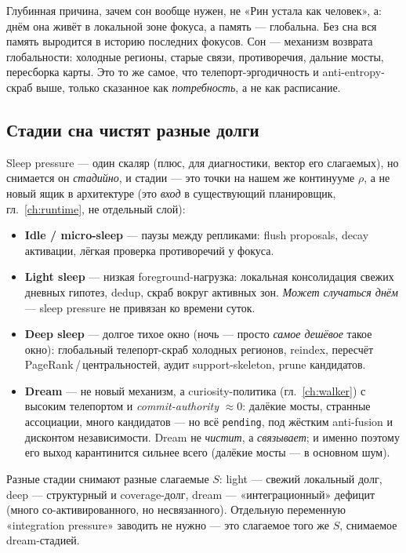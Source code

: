 \begin{principle}
Глубинная причина, зачем сон вообще нужен, не «Рин устала как человек», а: днём она живёт
в локальной зоне фокуса, а память — глобальна. Без сна вся память выродится в историю
последних фокусов. Сон — механизм возврата глобальности: холодные регионы, старые связи,
противоречия, дальние мосты, пересборка карты. Это то же самое, что телепорт-эргодичность
и anti-entropy-скраб выше, только сказанное как \emph{потребность}, а не как расписание.
\end{principle}

\subsection{Стадии сна чистят разные долги}

Sleep pressure — один скаляр (плюс, для диагностики, вектор его слагаемых), но снимается
он \emph{стадийно}, и стадии — это точки на нашем же континууме $\rho$, а не новый ящик в
архитектуре (это \emph{вход} в существующий планировщик, гл.~\ref{ch:runtime}, не отдельный
слой):
\begin{itemize}\itemsep2pt
\item \textbf{Idle / micro-sleep} — паузы между репликами: flush proposals, decay
активации, лёгкая проверка противоречий у фокуса.
\item \textbf{Light sleep} — низкая foreground-нагрузка: локальная консолидация свежих
дневных гипотез, dedup, скраб вокруг активных зон. \emph{Может случаться днём} —
sleep pressure не привязан ко времени суток.
\item \textbf{Deep sleep} — долгое тихое окно (ночь — просто \emph{самое дешёвое} такое
окно): глобальный телепорт-скраб холодных регионов, reindex, пересчёт
PageRank\,/\,центральностей, аудит support-skeleton, prune кандидатов.
\item \textbf{Dream} — не новый механизм, а curiosity-политика (гл.~\ref{ch:walker}) с
высоким телепортом и \emph{commit-authority} $\approx0$: далёкие мосты, странные
ассоциации, много кандидатов — но всё \texttt{pending}, под жёстким anti-fusion и
дисконтом независимости. Dream не \emph{чистит}, а \emph{связывает}; и именно поэтому
его выход карантинится сильнее всего (далёкие мосты — в основном шум).
\end{itemize}
Разные стадии снимают разные слагаемые $S$: light — свежий локальный долг, deep —
структурный и coverage-долг, dream — «интеграционный» дефицит (много со-активированного,
но несвязанного). Отдельную переменную «integration pressure» заводить не нужно — это
слагаемое того же $S$, снимаемое dream-стадией.

